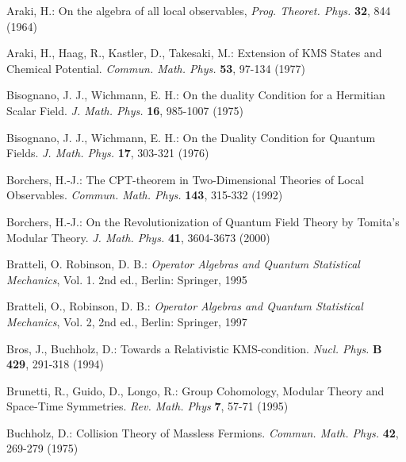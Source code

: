 \documentclass[a4paper,11pt]{article}
\begin{document}
\begin{thebibliography}{*****}

 Araki, H.: On the algebra of all local observables,
{\it Prog. Theoret. Phys.} {\bf 32}, 844 (1964)

 Araki, H., Haag, R., Kastler, D., Takesaki, M.: Extension of
KMS States and Chemical Potential. {\it Commun. Math. Phys.} {\bf 53}, 97-134 (1977)


 Bisognano, J. J., Wichmann, E. H.: On the duality Condition
for a Hermitian Scalar Field. {\it J. Math. Phys.} {\bf 16}, 985-1007 (1975)

 Bisognano, J. J., Wichmann, E. H.: On the Duality Condition
for Quantum Fields. {\it J. Math. Phys.} {\bf 17}, 303-321 (1976)


 Borchers, H.-J.: The CPT-theorem in Two-Dimensional Theories
of Local Observables. {\it Commun. Math. Phys.} {\bf 143}, 315-332 (1992)

 Borchers, H.-J.:
On the Revolutionization of Quantum Field Theory
by Tomita's Modular Theory. {\it J. Math. Phys.} {\bf 41},
3604-3673 (2000)

 Bratteli, O. Robinson, D. B.: {\it Operator Algebras and
Quantum Statistical Mechanics}, Vol. 1. 2nd ed., Berlin: Springer, 1995

 Bratteli, O., Robinson, D. B.: {\it Operator Algebras and
Quantum Statistical Mechanics}, Vol. 2, 2nd ed., Berlin: Springer, 1997

 Bros, J., Buchholz, D.: Towards a Relativistic KMS-condition.
{\it Nucl. Phys.} {\bf B 429}, 291-318 (1994)

 Brunetti, R., Guido, D., Longo, R.: Group Cohomology,
Modular Theory
and Space-Time Symmetries. {\it Rev. Math. Phys} {\bf 7}, 57-71 (1995)

 Buchholz, D.: Collision Theory of Massless Fermions.
{\it Commun. Math. Phys.} {\bf 42}, 269-279 (1975)



\end{thebibliography}
\end{document}

